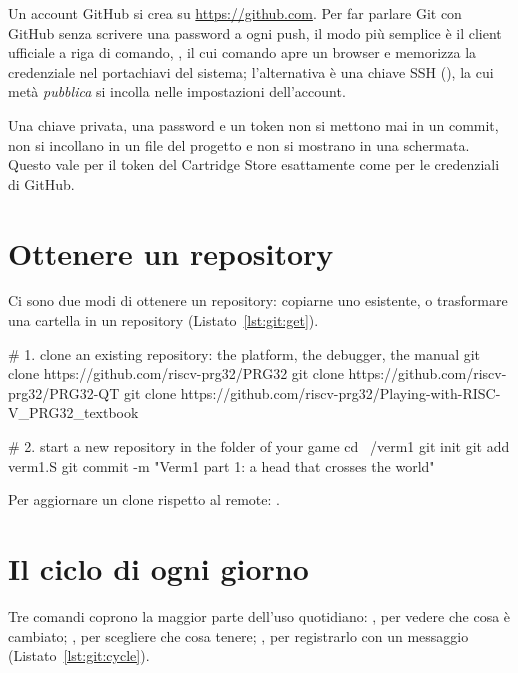 Un account GitHub si crea su \url{https://github.com}. Per far parlare Git con
GitHub senza scrivere una password a ogni push, il modo più semplice è il
client ufficiale a riga di comando, , il cui comando
 apre un browser e memorizza la credenziale nel portachiavi
del sistema; l'alternativa è una chiave SSH (), la
cui metà \emph{pubblica} si incolla nelle impostazioni dell'account.

\begin{prgwarn}
Una chiave privata, una password e un token non si mettono mai in un commit,
non si incollano in un file del progetto e non si mostrano in una schermata.
Questo vale per il token del Cartridge Store esattamente come per le
credenziali di GitHub.
\end{prgwarn}

\section{Ottenere un repository}

Ci sono due modi di ottenere un repository: copiarne uno esistente, o
trasformare una cartella in un repository (Listato~\ref{lst:git:get}).

\begin{shell}[caption={Clonare la piattaforma; avviare un proprio progetto.},label=lst:git:get]
# 1. clone an existing repository: the platform, the debugger, the manual
git clone https://github.com/riscv-prg32/PRG32
git clone https://github.com/riscv-prg32/PRG32-QT
git clone https://github.com/riscv-prg32/Playing-with-RISC-V_PRG32_textbook

# 2. start a new repository in the folder of your game
cd ~/verm1
git init
git add verm1.S
git commit -m "Verm1 part 1: a head that crosses the world"
\end{shell}

Per aggiornare un clone rispetto al remote: .

\section{Il ciclo di ogni giorno}

Tre comandi coprono la maggior parte dell'uso quotidiano: , per
vedere che cosa è cambiato; , per scegliere che cosa tenere;
, per registrarlo con un messaggio
(Listato~\ref{lst:git:cycle}).

